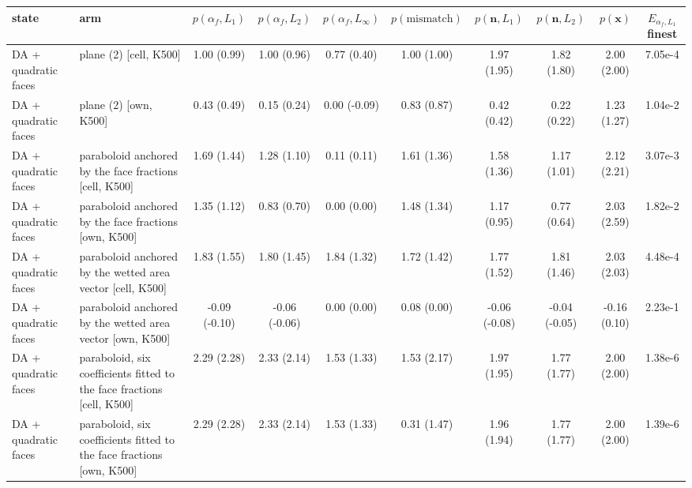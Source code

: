 \begin{tabular}{llcccccccc}
\toprule
state & arm & $p(\alpha_f, L_1)$ & $p(\alpha_f, L_2)$ & $p(\alpha_f, L_\infty)$ & $p(\text{mismatch})$ & $p(\mathbf{n}, L_1)$ & $p(\mathbf{n}, L_2)$ & $p(\mathbf{x})$ & $E_{\alpha_f, L_1}$ finest \\
\midrule
DA + quadratic faces & plane (2) [cell, K500] & 1.00 (0.99) & 1.00 (0.96) & 0.77 (0.40) & 1.00 (1.00) & 1.97 (1.95) & 1.82 (1.80) & 2.00 (2.00) & 7.05e-4 \\
DA + quadratic faces & plane (2) [own, K500] & 0.43 (0.49) & 0.15 (0.24) & 0.00 (-0.09) & 0.83 (0.87) & 0.42 (0.42) & 0.22 (0.22) & 1.23 (1.27) & 1.04e-2 \\
DA + quadratic faces & paraboloid anchored by the face fractions [cell, K500] & 1.69 (1.44) & 1.28 (1.10) & 0.11 (0.11) & 1.61 (1.36) & 1.58 (1.36) & 1.17 (1.01) & 2.12 (2.21) & 3.07e-3 \\
DA + quadratic faces & paraboloid anchored by the face fractions [own, K500] & 1.35 (1.12) & 0.83 (0.70) & 0.00 (0.00) & 1.48 (1.34) & 1.17 (0.95) & 0.77 (0.64) & 2.03 (2.59) & 1.82e-2 \\
DA + quadratic faces & paraboloid anchored by the wetted area vector [cell, K500] & 1.83 (1.55) & 1.80 (1.45) & 1.84 (1.32) & 1.72 (1.42) & 1.77 (1.52) & 1.81 (1.46) & 2.03 (2.03) & 4.48e-4 \\
DA + quadratic faces & paraboloid anchored by the wetted area vector [own, K500] & -0.09 (-0.10) & -0.06 (-0.06) & 0.00 (0.00) & 0.08 (0.00) & -0.06 (-0.08) & -0.04 (-0.05) & -0.16 (0.10) & 2.23e-1 \\
DA + quadratic faces & paraboloid, six coefficients fitted to the face fractions [cell, K500] & 2.29 (2.28) & 2.33 (2.14) & 1.53 (1.33) & 1.53 (2.17) & 1.97 (1.95) & 1.77 (1.77) & 2.00 (2.00) & 1.38e-6 \\
DA + quadratic faces & paraboloid, six coefficients fitted to the face fractions [own, K500] & 2.29 (2.28) & 2.33 (2.14) & 1.53 (1.33) & 0.31 (1.47) & 1.96 (1.94) & 1.77 (1.77) & 2.00 (2.00) & 1.39e-6 \\
\bottomrule
\end{tabular}
